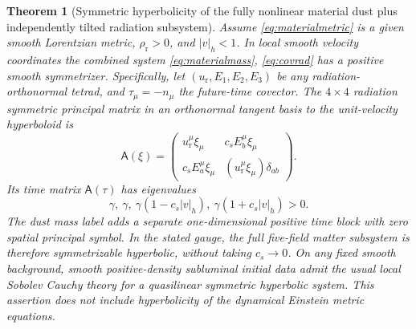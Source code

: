 \documentclass[11pt,a4paper]{article}
\newtheorem{theorem}{Theorem}
\begin{document}
\begin{theorem}[Symmetric hyperbolicity of the fully nonlinear
material dust plus independently tilted radiation subsystem]
\label{thm:tilted}
Assume \eqref{eq:materialmetric} is a given
smooth Lorentzian metric, $\rho_{\mathrm r}>0$,
and $|v|_h<1$. In local smooth velocity
coordinates the combined system
\eqref{eq:materialmass}, \eqref{eq:covrad}
has a positive smooth symmetrizer.
Specifically, let
$(u_{\mathrm r},E_1,E_2,E_3)$ be any
radiation-orthonormal tetrad, and
$\tau_\mu=-n_\mu$ the future-time covector.
The $4\times4$ radiation symmetric
principal matrix in an orthonormal tangent
basis to the unit-velocity hyperboloid is
\begin{equation}\label{eq:Axi}
\mathsf A(\xi)=
\begin{pmatrix}
u_{\mathrm r}^\mu\xi_\mu &
c_s E_b^\mu\xi_\mu\\
c_s E_a^\mu\xi_\mu&
(u_{\mathrm r}^\mu\xi_\mu)\delta_{ab}
\end{pmatrix}.
\end{equation}
Its time matrix
$\mathsf A(\tau)$ has eigenvalues
\begin{equation}\label{eq:A0eigen}
\boxed{\quad
\gamma,\ \gamma,\
\gamma(1-c_s|v|_h),\
\gamma(1+c_s|v|_h)>0.
\quad}
\end{equation}
The dust mass label adds a separate
one-dimensional positive time block with
zero spatial principal symbol. In the
stated gauge, the full five-field matter
subsystem is therefore \emph{symmetrizable
hyperbolic}, without taking $c_s\to0$.
On any fixed smooth background, smooth
positive-density subluminal initial data
admit the usual local Sobolev Cauchy
theory for a quasilinear symmetric
hyperbolic system. This assertion does
\emph{not} include hyperbolicity of the
dynamical Einstein metric equations.
\end{theorem}
\end{document}
